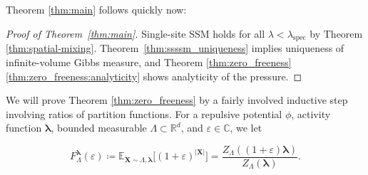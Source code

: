 \documentclass[10pt]{amsart}
\theoremstyle{definition}
\theoremstyle{remark}
\def\eps{{\varepsilon}}
\newcommand{\spec}{{\mathrm{spec}}}
\newcommand{\bX}{\mathbf{X}}
\newcommand{\E}{\mathbb{E}}
\newcommand{\R}{\mathbb{R}}
\newcommand{\region}{\Lambda}
\newcommand{\activities}{\pmb{\lambda}}
\newcommand{\size}[1]{\left\lvert#1\right\rvert}
\begin{document}
	
	Theorem \ref{thm:main} follows quickly now:
	\begin{proof}[Proof of Theorem~\ref{thm:main}]
		Single-site SSM holds for all $\lambda < \lambda_\spec$ by Theorem \ref{thm:spatial-mixing}.  Theorem~\ref{thm:ssssm_uniqueness} implies uniqueness of infinite-volume Gibbs measure, and Theorem \ref{thm:zero_freeness}\ref{thm:zero_freeness:analyticity} shows analyticity of the pressure.
	\end{proof}
	
	We will prove Theorem \ref{thm:zero_freeness} by a fairly involved inductive step involving ratios of partition functions. 
	For a repulsive potential $\phi$, activity function $\activities$, bounded measurable $\region \subset \R^d$, and $\eps\in \mathbb{C}$, we let
	
	\[
	F_{\region}^{\activities}(\varepsilon)
	\coloneqq
	\E_{\bX\sim\region,\activities}
	\big[(1+\varepsilon)^{\size{\bX}}\big]
	=
	\frac{Z_{\region}((1+\varepsilon)\activities)}{Z_{\region}(\activities)} .
	\]
	
\end{document}
